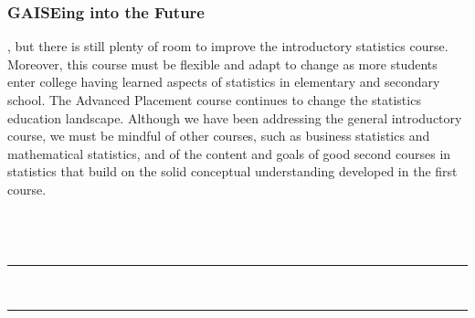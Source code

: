\section{\textbf{GAISEing into the Future}}
 
, but there is still plenty of room to improve the introductory statistics course. Moreover, this course must be flexible and adapt to change as more students enter college having learned aspects of statistics in elementary and secondary school. The Advanced Placement course continues to change the statistics education landscape. Although we have been addressing the general introductory course, we must be mindful of other courses, such as business statistics and mathematical statistics, and of the content and goals of good second courses in statistics that build on the solid conceptual understanding developed in the first course.


\part*{}

\noindent {} \\
   \noindent\color{graylight}\rule[0cm]{3.25in}{0.03cm} \\
    \noindent\color{graylight}\rule[0.4cm]{3.25in}{0.03cm} \\
\color{black}
\vspace{.05in}

\renewcommand{\theenumi}{\arabic{enumi}.}
\renewcommand{\labelenumi}{\theenumi}
\renewcommand{\theenumii}{\alph{enumii}.}
\renewcommand{\labelenumii}{\theenumii}

